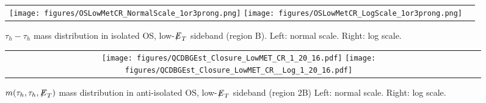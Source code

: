 \begin{table}[!htpb]
   \caption{ Yields in the control regions B and D used for calculation of OS/LS ratio.}
   \label{table:OLSStable} %
 \end{table}
  
\begin{figure}[tbhp!]
      \centering
      \begin{tabular}{cc}
        \texttt{[image: figures/OSLowMetCR\_NormalScale\_1or3prong.png]}
        \texttt{[image: figures/OSLowMetCR\_LogScale\_1or3prong.png]}
      \end{tabular}
     \caption{$\tau_{h} - \tau_{h}$ mass distribution in isolated OS, low-${\not\mathrel{E}}_T$ sideband (region B). Left: normal scale.  Right: log scale.}
    \label{fig:MG304}
 \end{figure}

\begin{figure}[tbhp!]
      \centering
      \begin{tabular}{cc}
        \texttt{[image: figures/QCDBGEst\_Closure\_LowMET\_CR\_1\_20\_16.pdf]}
        \texttt{[image: figures/QCDBGEst\_Closure\_LowMET\_CR\_\_Log\_1\_20\_16.pdf]}
      \end{tabular}
     \caption{$m(\tau_{h},\tau_{h},{\not\mathrel{E}}_T)$ mass distribution in anti-isolated OS, low-${\not\mathrel{E}}_T$ sideband (region 2B) Left: normal scale.  Right: log scale.}
    \label{fig:MG305}
 \end{figure}


